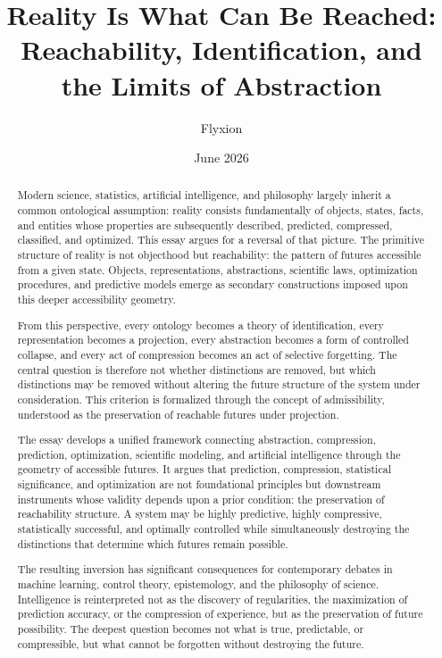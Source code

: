 \documentclass[12pt,a4paper]{article}
\title{\textbf{Reality Is What Can Be Reached:\\
Reachability, Identification, and the Limits of Abstraction}}
\author{Flyxion}
\date{June 2026}
\theoremstyle{plain}
\theoremstyle{definition}
\theoremstyle{remark}
\begin{document}
\maketitle

\begin{abstract}
\noindent
Modern science, statistics, artificial intelligence, and philosophy largely
inherit a common ontological assumption: reality consists fundamentally of
objects, states, facts, and entities whose properties are subsequently
described, predicted, compressed, classified, and optimized. This essay
argues for a reversal of that picture. The primitive structure of reality is
not objecthood but reachability: the pattern of futures accessible from a
given state. Objects, representations, abstractions, scientific laws,
optimization procedures, and predictive models emerge as secondary
constructions imposed upon this deeper accessibility geometry.

From this perspective, every ontology becomes a theory of identification,
every representation becomes a projection, every abstraction becomes a form of
controlled collapse, and every act of compression becomes an act of selective
forgetting. The central question is therefore not whether distinctions are
removed, but which distinctions may be removed without altering the future
structure of the system under consideration. This criterion is formalized
through the concept of admissibility, understood as the preservation of
reachable futures under projection.

The essay develops a unified framework connecting abstraction, compression,
prediction, optimization, scientific modeling, and artificial intelligence
through the geometry of accessible futures. It argues that prediction,
compression, statistical significance, and optimization are not foundational
principles but downstream instruments whose validity depends upon a prior
condition: the preservation of reachability structure. A system may be highly
predictive, highly compressive, statistically successful, and optimally
controlled while simultaneously destroying the distinctions that determine
which futures remain possible.

The resulting inversion has significant consequences for contemporary debates
in machine learning, control theory, epistemology, and the philosophy of
science. Intelligence is reinterpreted not as the discovery of regularities,
the maximization of prediction accuracy, or the compression of experience,
but as the preservation of future possibility. The deepest question becomes
not what is true, predictable, or compressible, but what cannot be forgotten
without destroying the future.
\end{abstract}
\end{document}
